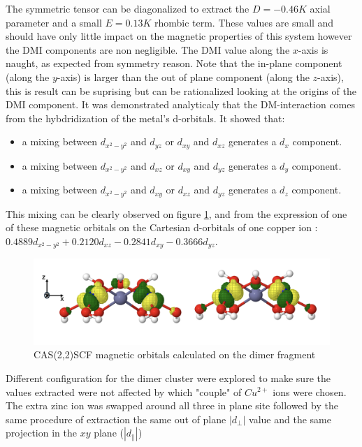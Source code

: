 \documentclass[10pt]{report}
\numberwithin{equation}{section}
\begin{document}
The symmetric tensor can be diagonalized to extract the $ D = - 0.46 K $ axial parameter and a small $ E = 0.13 K$ rhombic term. These values are small and should have only little impact on the magnetic properties of this system however the DMI components are non negligible. 
The DMI value along the $x$-axis is naught, as expected from symmetry reason. 
Note that the in-plane component (along the $y$-axis) is larger than the out of plane component (along the $z$-axis), this is result can be suprising but can be rationalized looking at the origins of the DMI component.
It was demonstrated analyticaly that the DM-interaction comes from the hybdridization of the metal's d-orbitals. 
It showed that:
\begin{itemize}
    \item a mixing between $ d_{x^2-y^2}$ and $ d_{yz}$ or $ d_{xy}$ and $d_{xz}$ generates a $ d_{x}$ component.
    \item a mixing between $d_{x^2-y^2}$ and $ d_{xz}$ or $ d_{xy}$ and $d_{yz}$ generates a $ d_{y}$ component.
    \item a mixing between $ d_{x^2-y^2}$ and $d_{xy}$ or $ d_{xz}$ and $d_{yz}$ generates a $ d_{z}$ component.
\end{itemize}

This mixing can be clearly observed on figure \ref{CAS22}, and from the expression of one of these magnetic orbitals on the Cartesian
d-orbitals of one copper ion : $0.4889d_{x^2-y^2}+0.2120d_{xz}-0.2841d_{xy}-0.3666d_{yz}$.

\begin{figure}[h!]
    \centering
    \includegraphics[width=\textwidth]{Images/CAS22.png}
    \caption{CAS(2,2)SCF magnetic orbitals calculated on the dimer fragment}
    \label{CAS22}
\end{figure}


Different configuration for the dimer cluster were explored to make sure the values extracted were not affected by which "couple" of $Cu^{2+}$ ions were chosen. 
The extra zinc ion was swapped around all three in plane site followed by the same procedure of extraction the same out of plane $|d_{\perp}|$ value and the same projection in the $xy$ plane ($|d_{\parallel}|$)
\end{document}
